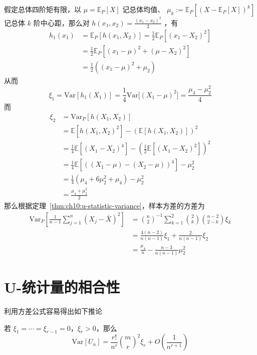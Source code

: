 \begin{example}[样本方差的方差]
假定总体四阶矩有限，以 $\mu=\mathbb E_P[X]$ 记总体均值、 $\mu_k:=\mathbb E_P[(X-\mathbb E_P[X])^k]$ 记总体 $k$ 阶中心距，那么对 $h(x_1,x_2)=\tfrac{(x_1-x_2)^2}{2}$ ，有
\[\begin{aligned} h_1(x_1)&=\mathbb E_P[h(x_1,X_2)]=\frac12\mathbb E_P[(x_1-X_2)^2]\\ &=\frac12\mathbb E_P[(x_1-\mu)^2+(\mu-X_2)^2]\\ &=\frac12((x_1-\mu)^2+\mu_2) \end{aligned}\]
从而 \[ \xi_1=\mathrm{Var}[h_1(X_1)] = \frac14 \mathrm{Var}\!\big[(X_1-\mu)^2\big]=\frac{\mu_4-\mu_2^2}4 \]而
\[\begin{aligned} \xi_2&=\mathrm{Var}_P[h(X_1,X_2)] \\&= \mathbb{E}[h(X_1,X_2)^2] - (\mathbb{E}[h(X_1,X_2)])^2 \\ &= \frac14 \mathbb{E}[(X_1-X_2)^4] - \left( \frac12 \mathbb{E}[(X_1-X_2)^2] \right)^2 \\ &= \frac14 \mathbb{E}[((X_1-\mu)-(X_2-\mu))^4] - \mu_2^2 \\ &= \frac14 ( \mu_4 + 6\mu_2^2 + \mu_4 ) - \mu_2^2 \\ &= \frac{\mu_4 + \mu_2^2}{2} \end{aligned}\]
那么根据定理~\ref{thm:ch10:u-statistic-variance}，样本方差的方差为
\[\begin{aligned}\mathrm{Var}_P\left[\frac1{n-1}\sum_{j=1}^n(X_j-\bar X)^2\right]&=\binom{n}{2}^{-1} \sum_{k=1}^{2} \binom{2}{k} \binom{n-2}{2-k} \xi_k \\ &= \frac{4(n-2)}{n(n-1)}\xi_1 + \frac{2}{n(n-1)}\xi_2\\ &=\frac{\mu_4}{n} - \frac{n-3}{n(n-1)}\mu_2^2 \end{aligned}\]

\end{example}

\section{U-统计量的相合性}

利用方差公式容易得出如下推论

\begin{corollary}\label{cor:ch10:u-statistic-variance-order}
若 $\xi_1=\cdots=\xi_{r-1}=0$，$\xi_r>0$，那么
\[\mathrm{Var}[U_n]=\frac{r!}{n^r}{\binom mr}^2\xi_r+O\left(\frac1{n^{r+1}}\right)\]\end{corollary}

